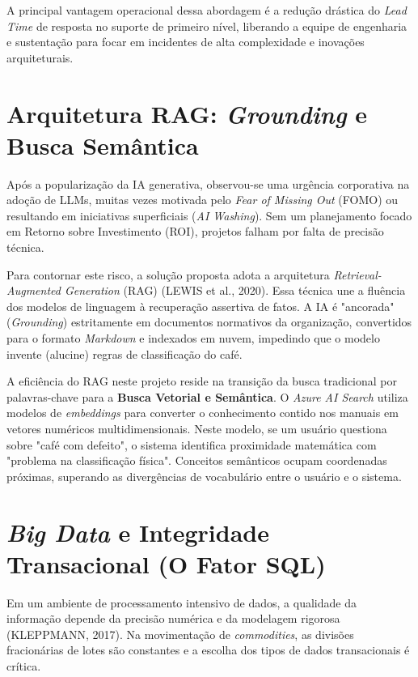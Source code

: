 A principal vantagem operacional dessa abordagem é a redução drástica do \textit{Lead Time} de resposta no suporte de primeiro nível, liberando a equipe de engenharia e sustentação para focar em incidentes de alta complexidade e inovações arquiteturais.

\section{Arquitetura RAG: \textit{Grounding} e Busca Semântica}

Após a popularização da IA generativa, observou-se uma urgência corporativa na adoção de LLMs, muitas vezes motivada pelo \textit{Fear of Missing Out} (FOMO) ou resultando em iniciativas superficiais (\textit{AI Washing}). Sem um planejamento focado em Retorno sobre Investimento (ROI), projetos falham por falta de precisão técnica. 

Para contornar este risco, a solução proposta adota a arquitetura \textit{Retrieval-Augmented Generation} (RAG) (LEWIS et al., 2020). Essa técnica une a fluência dos modelos de linguagem à recuperação assertiva de fatos. A IA é "ancorada" (\textit{Grounding}) estritamente em documentos normativos da organização, convertidos para o formato \textit{Markdown} e indexados em nuvem, impedindo que o modelo invente (alucine) regras de classificação do café.

A eficiência do RAG neste projeto reside na transição da busca tradicional por palavras-chave para a \textbf{Busca Vetorial e Semântica}. O \textit{Azure AI Search} utiliza modelos de \textit{embeddings} para converter o conhecimento contido nos manuais em vetores numéricos multidimensionais. Neste modelo, se um usuário questiona sobre "café com defeito", o sistema identifica proximidade matemática com "problema na classificação física". Conceitos semânticos ocupam coordenadas próximas, superando as divergências de vocabulário entre o usuário e o sistema.

\section{\textit{Big Data} e Integridade Transacional (O Fator SQL)}

Em um ambiente de processamento intensivo de dados, a qualidade da informação depende da precisão numérica e da modelagem rigorosa (KLEPPMANN, 2017). Na movimentação de \textit{commodities}, as divisões fracionárias de lotes são constantes e a escolha dos tipos de dados transacionais é crítica.

